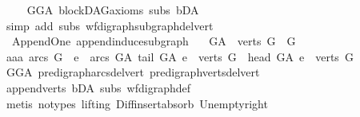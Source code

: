 \begin{isabellebody}
%
\isadelimproof
\ \ %
\endisadelimproof
%
\isatagproof
{}\isamarkupfalse%
\ \ GG{\isacharunderscore}{\kern0pt}A\ blockDAG{\isacharunderscore}{\kern0pt}axioms\ subs\ bD{\isacharunderscore}{\kern0pt}A\isanewline
\ \ \isamarkupfalse%
\ {\isacharparenleft}{\kern0pt}simp\ add{\isacharcolon}{\kern0pt}\ subs\ wf{\isacharunderscore}{\kern0pt}digraph{\isachardot}{\kern0pt}subgraph{\isacharunderscore}{\kern0pt}del{\isacharunderscore}{\kern0pt}vert{\isacharparenright}{\kern0pt}%
\endisatagproof
{\isafoldproof}%
%
\isadelimproof
\ \isanewline
%
\endisadelimproof
\isanewline
\isanewline
{}\isamarkupfalse%
\ {\isacharparenleft}{\kern0pt}\ Append{\isacharunderscore}{\kern0pt}One{\isacharparenright}{\kern0pt}\ append{\isacharunderscore}{\kern0pt}induce{\isacharunderscore}{\kern0pt}subgraph{\isacharcolon}{\kern0pt}\ \isanewline
\ \ {\isachardoublequoteopen}G{\isacharunderscore}{\kern0pt}A\ {\isasymrestriction}\ {\isacharparenleft}{\kern0pt}verts\ G{\isacharparenright}{\kern0pt}\ {\isacharequal}{\kern0pt}\ G{\isachardoublequoteclose}\ \ \isanewline
%
\isadelimproof
%
\endisadelimproof
%
\isatagproof
{}\isamarkupfalse%
\ {\isacharminus}{\kern0pt}\isanewline
\ \ \isamarkupfalse%
\ aaa{\isacharcolon}{\kern0pt}\ {\isachardoublequoteopen}arcs\ G\ {\isacharequal}{\kern0pt}\ {\isacharbraceleft}{\kern0pt}e\ {\isasymin}\ arcs\ G{\isacharunderscore}{\kern0pt}A{\isachardot}{\kern0pt}\ tail\ G{\isacharunderscore}{\kern0pt}A\ e\ {\isasymin}\ verts\ G\ {\isasymand}\ head\ G{\isacharunderscore}{\kern0pt}A\ e\ {\isasymin}\ verts\ G{\isacharbraceright}{\kern0pt}{\isachardoublequoteclose}\isanewline
\ \ \ \ \isamarkupfalse%
\ GG{\isacharunderscore}{\kern0pt}A\ pre{\isacharunderscore}{\kern0pt}digraph{\isachardot}{\kern0pt}arcs{\isacharunderscore}{\kern0pt}del{\isacharunderscore}{\kern0pt}vert\ pre{\isacharunderscore}{\kern0pt}digraph{\isachardot}{\kern0pt}verts{\isacharunderscore}{\kern0pt}del{\isacharunderscore}{\kern0pt}vert\isanewline
\ \ \isamarkupfalse%
\ append{\isacharunderscore}{\kern0pt}verts\ bD{\isacharunderscore}{\kern0pt}A\ subs\ wf{\isacharunderscore}{\kern0pt}digraph{\isacharunderscore}{\kern0pt}def\isanewline
\ \ \isamarkupfalse%
\ {\isacharparenleft}{\kern0pt}metis\ {\isacharparenleft}{\kern0pt}no{\isacharunderscore}{\kern0pt}types{\isacharcomma}{\kern0pt}\ lifting{\isacharparenright}{\kern0pt}\ Diff{\isacharunderscore}{\kern0pt}insert{\isacharunderscore}{\kern0pt}absorb\ Un{\isacharunderscore}{\kern0pt}empty{\isacharunderscore}{\kern0pt}right\isanewline

\end{isabellebody}
